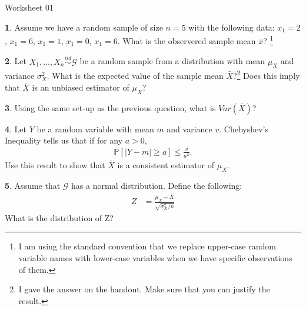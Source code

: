 \documentclass{tufte-handout}
\newcommand{\iid}{\stackrel{iid}{\sim}}
\begin{document}
\justify

{\LARGE Worksheet 01}

\vspace*{18pt}


\textbf{1}. Assume we have a random sample of size $n = 5$ with the following data:
$x_1 = 2$, $x_1 = 6$, $x_1 = 1$, $x_1 = 0$, $x_1 = 6$. What is the observered
sample mean $\bar{x}$? 
\footnote{
  I am using the standard convention that we replace upper-case random 
  variable names with lower-case variables when we have specific 
  observations of them. 
}

\textbf{2}. Let $X_1, \ldots, X_n \iid \mathcal{G}$ be a random sample from a distribution
with mean $\mu_X$ and variance $\sigma^2_X$. What is the expected value of the
sample mean $\bar{X}$?\footnote{
  I gave the answer on the handout. Make sure that you can justify
  the result.
} Does this imply that $\bar{X}$ is an unbiased estimator of $\mu_X$?

\textbf{3}. Using the same set-up as the previous question, what is $Var(\bar{X})$?

\textbf{4}. Let $Y$ be a random variable with mean $m$ and variance $v$. Chebyshev's
Inequality tells us that if for any $a > 0$,
\begin{align*}
\mathbb{P}[ |Y - m| \geq a] \leq \frac{v}{a^2}.
\end{align*}
Use this result to show that $\bar{X}$ is a consistent estimator of $\mu_X$.

\textbf{5}. Assume that $\mathcal{G}$ has a normal distribution. Define the following:
\begin{align*}
Z &= \frac{\mu_X - \bar{X}}{\sqrt{\sigma_X^2 / n}}
\end{align*}
What is the distribution of Z?
\end{document}

